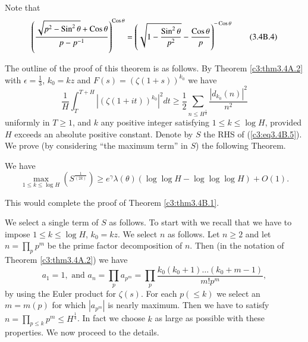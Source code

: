 \begin{remark*}
Note that\pageoriginale
\begin{equation*}
\left(\frac{\sqrt{p^2 - \operatorname{Sin}^2 \theta} + \operatorname{Cos} \theta}{p-p^{-1}} \right)^{\operatorname{Cos} \theta} = \left(\sqrt{1-\frac{\operatorname{Sin}^2 \theta}{p^2}} - \frac{\operatorname{Cos} \theta}{p} \right)^{-\operatorname{Cos} \theta}
\tag{3.4B.4}\label{c3:eq3.4B.4}
\end{equation*}

The outline of the proof of this theorem is as follows. By Theorem \ref{c3:thm3.4A.2} with $\epsilon = \frac{1}{3}$, $k_0 = kz$ and $F(s) = (\zeta(1+s))^{k_0}$ we have
\begin{equation*}
\frac{1}{H} \int^{T+H}_T |(\zeta (1+ it))^{k_0}|^2 dt \geq \frac{1}{2} \sum\limits_{n \leq H^{\frac{1}{4}}} \frac{|d_{k_0} (n)|^2}{n^2} \tag{3.4B.5}\label{c3:eq3.4B.5}
\end{equation*}
uniformly in $T \geq 1$, and $k$ any positive integer satisfying $1 \leq k \leq \log H$, provided $H$ exceeds an absolute positive constant. Denote by $S$ the RHS of (\ref{c3:eq3.4B.5}). We prove (by considering ``the maximum term'' in $S$) the following Theorem.
\end{remark*}


\begin{alphtheorem}\label{c3:thm3.4B.2}
We have
\begin{equation*}
\max\limits_{1\leq k \leq \log H} \left(S^{\frac{1}{(2k)}} \right) \geq e^{\gamma}\lambda (\theta) (\log \log H - \log \log \log H) + O(1) .  \tag{3.4B.6}\label{c3:eq3.4B.6}
\end{equation*}
\end{alphtheorem}

\begin{remark*}
This would complete the proof of Theorem \ref{c3:thm3.4B.1}.

We select a single term of $S$ as follows. To start with we recall that we have to impose $1 \leq k \leq \log H$, $k_0 = kz$. We select $n$ as follows. Let $n\geq 2$ and let $n =\prod\limits_p p^m$ be the prime factor decomposition of $n$. Then (in the notation of Theorem \ref{c3:thm3.4A.2}) we have
\begin{equation*}
a_1 =1, \text{ and } a_n = \prod\limits_p a_{p^m} = \prod\limits_p \frac{k_0 (k_0 +1) \ldots (k_0 + m -1)}{m!p^m}, \tag{3.4B.7}\label{c3:eq3.4B.7}
\end{equation*}
by using the Euler product for $\zeta(s)$. For each $p(\leq k)$ we select an $m = m(p)$ for which $|a_{p^m}|$ is nearly maximum. Then we have to satisfy $n =\prod\limits_{p\leq k}p^m \leq H^{\frac{1}{4}}$. In fact we choose $k$ as large as possible with these properties. We now proceed to the details.
\end{remark*}


